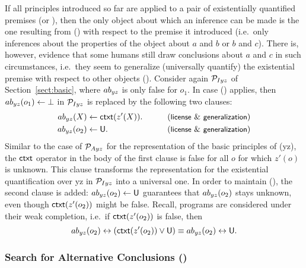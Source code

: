 \documentclass[12pt]{article}
\begin{document}
If all principles introduced so far are applied to a pair of existentially quantified premises
(\MI or \MO), then the only object about which an inference can be made is the one
resulting from () with respect to the premise it introduced (i.e.\ only inferences about the properties 
of the object about $a$ and $b$ or
$b$ and $c$). 
There is, however, evidence that some humans still draw conclusions about $a$ and $c$ in such
circumstances, i.e.\ they seem to generalize (universally quantify) the existential 
premise with respect to other objects (\negFailure).
Consider again ${\cal P}_{I yz}$ of Section~\ref{sect:basic}, where $ab_{yz}$ is only false for 
$o_1$. In case (\negFailure) applies, then $ab_{yz}(o_1) \leftarrow \bot$
in ${\cal P}_{I yz}$ is replaced by the following two clauses:
\begin{align}
\Ab_{yz}(X) & \leftarrow \cxt(z'(X)). & \tag{\licenses\ \&\ \negFailure} \\
\Ab_{yz}(o_2) & \leftarrow \udf. & \tag{\licenses\ \&\ \negFailure} 
\end{align}
Similar to the case of ${\cal P}_{Ayz}$ for the representation of the basic principles of (\MA yz),
the $\mathsf{ctxt}$ operator in the body of the first clause is false for all $o$
for which $z'(o)$ is unknown. This clause transforms the representation for the existential quantification over \MI yz in ${\cal P}_{Iyz}$
into a universal one. In order to maintain (\unknownGen), the second clause is added:
$ab_{yz}(o_2) \leftarrow \mathsf{U}$ guarantees that $ab_{yz}(o_2)$ stays unknown, even though $\mathsf{ctxt}(z'(o_2))$ might be false.
Recall, programs are considered under their weak completion, i.e.\ if $\mathsf{ctxt}(z'(o_2))$ is false, then
\[ab_{yz}(o_2) \leftrightarrow (\mathsf{ctxt}(z'(o_2)) \vee \mathsf{U})
 \equiv ab_{yz}(o_2) \leftrightarrow \mathsf{U}.\]




\subsubsection{Search for Alternative Conclusions (\abduction)}
\end{document}
